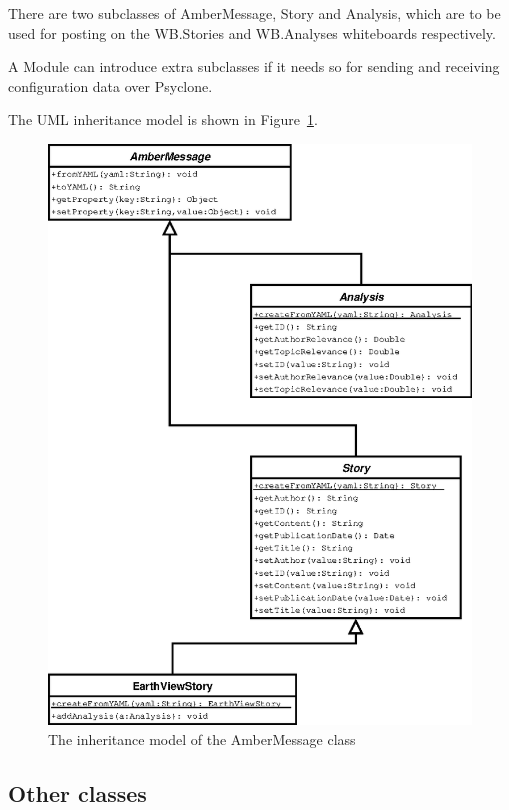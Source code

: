 There are two subclasses of AmberMessage, Story and Analysis, which are to be
used for posting on the WB.Stories and WB.Analyses whiteboards respectively.

A Module can introduce extra subclasses if it needs so for sending and
receiving configuration data over Psyclone.

The UML inheritance model is shown in
Figure~\ref{fig:class-diagram-ambermessage}.

\begin{figure}[htp]
  \centering
  \includegraphics{image/class-diagram-ambermessage}
  \caption{
    \label{fig:class-diagram-ambermessage}
    The inheritance model of the AmberMessage class}
\end{figure}

\subsection{Other classes}

